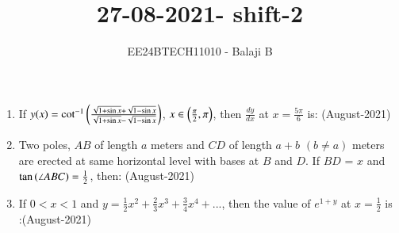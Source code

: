 \documentclass[journal]{IEEEtran}
\begin{document}

\vspace{3cm}

\title{27-08-2021- shift-2}
\author{EE24BTECH11010 - Balaji B}
{\let\newpage\relax\maketitle}
\begin{enumerate}
    \item If $y(x) = \cot^{-1}\left(\frac{\sqrt{1 + \sin{x}} + \sqrt{1 - \sin{x}}}{\sqrt{1 + \sin{x}} - \sqrt{1 - \sin{x}}}\right)$, $x \in \left(\frac{\pi}{2}, \pi\right)$, then $\frac{dy}{dx}$ at $x = \frac{5\pi}{6}$ is: \hfill (August-2021)
    \begin{enumerate}
    \end{enumerate}
    \item Two poles, $AB$ of length $a$ meters and $CD$ of length $ a + b$ $(b \neq a) $ meters are erected at same horizontal level with bases at $B$ and $D$. If $BD$ = $x$ and $\tan\left(\angle{ABC}\right) = \frac{1}{2}$, then: \hfill (August-2021)
    \begin{enumerate}
    \end{enumerate}
    \item If $0 < x < 1$ and $y = \frac{1}{2}x^2 + \frac{2}{3}x^3 + \frac{3}{4}x^4 + ...$, then the value of $e^{1+y}$ at $x = \frac{1}{2}$ is\\:\hfill (August-2021)
    \begin{enumerate}

\end{enumerate}
\end{enumerate}
\end{document}
